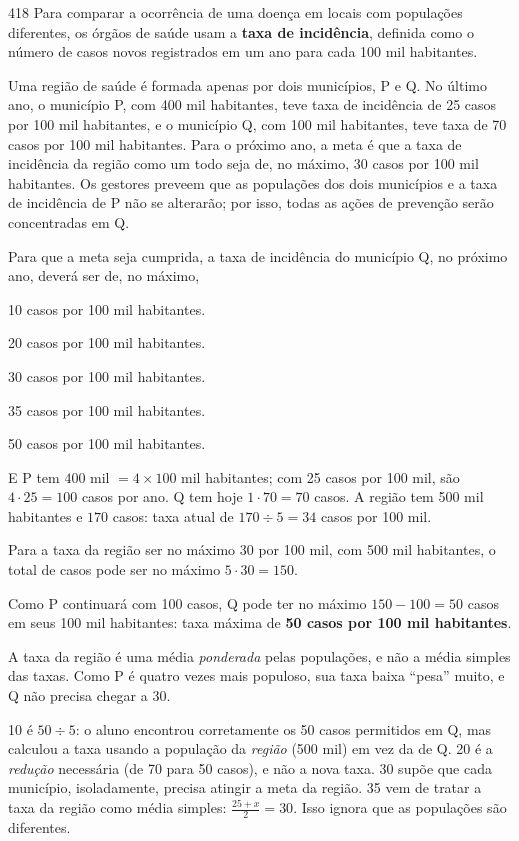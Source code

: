 \begin{questaoinedita}{4}{18}
Para comparar a ocorrência de uma doença em locais com populações diferentes, os
órgãos de saúde usam a \textbf{taxa de incidência}, definida como o número de casos
novos registrados em um ano para cada 100 mil habitantes.

Uma região de saúde é formada apenas por dois municípios, P e Q. No último ano, o
município P, com 400 mil habitantes, teve taxa de incidência de 25 casos por 100 mil
habitantes, e o município Q, com 100 mil habitantes, teve taxa de 70 casos por
100 mil habitantes. Para o próximo ano, a meta é que a taxa de incidência da região
como um todo seja de, no máximo, 30 casos por 100 mil habitantes. Os gestores preveem
que as populações dos dois municípios e a taxa de incidência de P não se alterarão;
por isso, todas as ações de prevenção serão concentradas em Q.

Para que a meta seja cumprida, a taxa de incidência do município Q, no próximo ano,
deverá ser de, no máximo,
\begin{alternativas}
  \item 10 casos por 100 mil habitantes.
  \item 20 casos por 100 mil habitantes.
  \item 30 casos por 100 mil habitantes.
  \item 35 casos por 100 mil habitantes.
  \item 50 casos por 100 mil habitantes.
\end{alternativas}
\end{questaoinedita}
\begin{resolucao}{E}
 P tem $400$ mil $= 4 \times 100$ mil habitantes;
com 25 casos por 100 mil, são $4 \cdot 25 = 100$ casos por ano. Q tem hoje
$1 \cdot 70 = 70$ casos. A região tem 500 mil habitantes e $170$ casos: taxa atual de
$170 \div 5 = 34$ casos por 100 mil.

 Para a taxa da região ser no máximo 30 por 100 mil,
com 500 mil habitantes, o total de casos pode ser no máximo $5 \cdot 30 = 150$.

 Como P continuará com 100 casos, Q pode ter no máximo
$150 - 100 = 50$ casos em seus 100 mil habitantes: taxa máxima de
\textbf{50 casos por 100 mil habitantes}.

 A taxa da região é uma média \emph{ponderada} pelas
populações, e não a média simples das taxas. Como P é quatro vezes mais populoso, sua
taxa baixa ``pesa'' muito, e Q não precisa chegar a 30.
\begin{distratores}
 10 é $50 \div 5$: o aluno encontrou corretamente os 50 casos permitidos em Q, mas
calculou a taxa usando a população da \emph{região} (500 mil) em vez da de Q.
 20 é a \emph{redução} necessária (de 70 para 50 casos), e não a nova taxa.
 30 supõe que cada município, isoladamente, precisa atingir a meta da região.
 35 vem de tratar a taxa da região como média simples: $\frac{25 + x}{2} = 30$.
Isso ignora que as populações são diferentes.
\end{distratores}
\end{resolucao}
